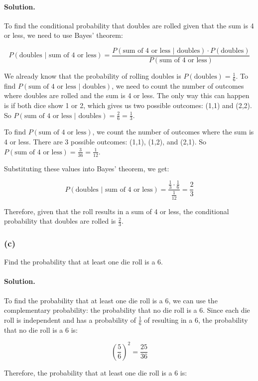 \paragraph{Solution.} To find the conditional probability that doubles are rolled given that the sum is 4 or less, we need to use Bayes' theorem:

$$P(\text{doubles }|\text{ sum of 4 or less}) = \frac{P(\text{sum of 4 or less }|\text{ doubles})\cdot P(\text{doubles})}{P(\text{sum of 4 or less})}$$

We already know that the probability of rolling doubles is $P(\text{doubles})=\frac{1}{6}$. To find $P(\text{sum of 4 or less }|\text{ doubles})$, we need to count the number of outcomes where doubles are rolled and the sum is 4 or less. The only way this can happen is if both dice show 1 or 2, which gives us two possible outcomes: (1,1) and (2,2). So $P(\text{sum of 4 or less }|\text{ doubles})=\frac{2}{6}=\frac{1}{3}$.

To find $P(\text{sum of 4 or less})$, we count the number of outcomes where the sum is 4 or less. There are 3 possible outcomes: (1,1), (1,2), and (2,1). So $P(\text{sum of 4 or less})=\frac{3}{36}=\frac{1}{12}$.

Substituting these values into Bayes' theorem, we get:

$$P(\text{doubles }|\text{ sum of 4 or less}) = \frac{\frac{1}{3}\cdot\frac{1}{6}}{\frac{1}{12}} = \frac{2}{3}$$

Therefore, given that the roll results in a sum of 4 or less, the conditional probability that doubles are rolled is $\frac{2}{3}$.

\subsubsection{(c)} Find the probability that at least one die roll is a 6.
\paragraph{Solution.} To find the probability that at least one die roll is a 6, we can use the complementary probability: the probability that no die roll is a 6. Since each die roll is independent and has a probability of $\frac{1}{6}$ of resulting in a 6, the probability that no die roll is a 6 is:

$$\left(\frac{5}{6}\right)^2=\frac{25}{36}$$

Therefore, the probability that at least one die roll is a 6 is:

